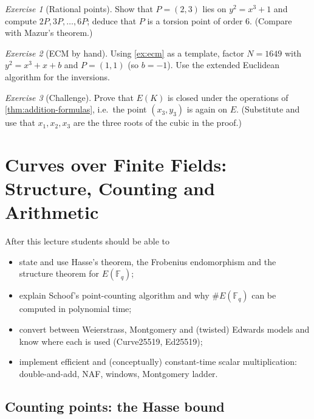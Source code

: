 \documentclass[11pt,a4paper,oneside]{book}
\theoremstyle{plain}
\theoremstyle{definition}
\theoremstyle{remark}
\newtheorem{exercise}{Exercise}[chapter]
\newcommand{\Fq}{\mathbb{F}_q}
\begin{document}
\begin{exercise}[Rational points]
Show that $P=(2,3)$ lies on $y^2=x^3+1$ and compute $2P,3P,\dots,6P$; deduce that $P$ is a torsion point of order $6$. (Compare with Mazur's theorem.)
\end{exercise}

\begin{exercise}[ECM by hand]
Using \cref{ex:ecm} as a template, factor $N=1649$ with $y^2=x^3+x+b$ and $P=(1,1)$ (so $b=-1$). Use the extended Euclidean algorithm for the inversions.
\end{exercise}

\begin{exercise}[Challenge]
Prove that $E(K)$ is closed under the operations of \cref{thm:addition-formulas}, i.e.\ the point $(x_3,y_3)$ is again on $E$. (Substitute and use that $x_1,x_2,x_3$ are the three roots of the cubic in the proof.)
\end{exercise}
\chapter{Curves over Finite Fields: Structure, Counting and Arithmetic}\label{ch:L2}

\begin{goalsbox}
After this lecture students should be able to
\begin{itemize}[nosep]
\item state and use Hasse's theorem, the Frobenius endomorphism and the structure theorem for $E(\Fq)$;
\item explain Schoof's point-counting algorithm and why $\#E(\Fq)$ can be computed in polynomial time;
\item convert between Weierstrass, Montgomery and (twisted) Edwards models and know where each is used (Curve25519, Ed25519);
\item implement efficient and (conceptually) constant-time scalar multiplication: double-and-add, NAF, windows, Montgomery ladder.
\end{itemize}
\end{goalsbox}

\section{Counting points: the Hasse bound}
\end{document}
